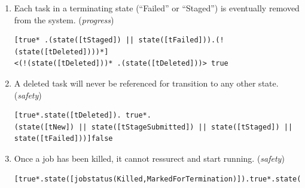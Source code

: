 \documentclass[sort&compress,preprint,3p]{elsarticle}
\begin{document}
\renewcommand{\labelenumi}{\arabic{enumi}.}

\begin{enumerate}
\item Each task in a terminating state (``Failed'' or ``Staged'') is eventually removed from the system. (\textit{progress})

\begin{lstlisting}[basicstyle=\ttfamily\fontsize{8}{9}\selectfont]
[true* .(state([tStaged]) || state([tFailed])).(!(state([tDeleted])))*] 
<(!(state([tDeleted]))* .(state([tDeleted]))> true
\end{lstlisting} 

\item A deleted task will never be referenced for transition to any other state. (\textit{safety})
\begin{lstlisting}[basicstyle=\ttfamily\fontsize{8}{9}\selectfont]
[true*.state([tDeleted]). true*. 
(state([tNew]) || state([tStageSubmitted]) || state([tStaged]) || state([tFailed]))]false
\end{lstlisting}
\item Once a job has been killed, it cannot ressurect and start running. (\textit{safety})

\begin{lstlisting}[basicstyle=\ttfamily\fontsize{8}{9}\selectfont]
[true*.state([jobstatus(Killed,MarkedForTermination)]).true*.state([jobstatus(Running,JobInitialization)])]false
\end{lstlisting} 

\end{enumerate}
\end{document}
